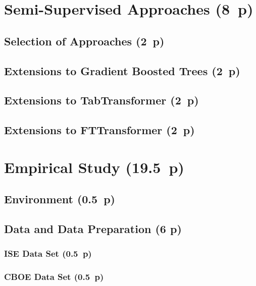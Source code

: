 \newpage
\section{Semi-Supervised Approaches (8~p)}\label{sec:semi-supervised-approaches}

\subsection{Selection of Approaches (2~p)}\label{sec:selection-of-approaches-1}

\subsection{Extensions to Gradient Boosted
  Trees (2~p)}\label{sec:extensions-to-gradient-boosted-trees}

\subsection{Extensions to TabTransformer (2~p)}\label{sec:extensions-to-tabtransformer}

\subsection{Extensions to FTTransformer (2~p)}\label{sec:extensions-to-fttransformer}


\newpage
\section{Empirical Study (19.5~p)}\label{sec:empirical-study}

\subsection{Environment (0.5~p)}\label{sec:environment}

\subsection{Data and Data Preparation (6 p)}\label{sec:data-and-data-preparation}

\subsubsection{ISE Data Set (0.5~p)}\label{sec:ise-data-set}

\subsubsection{CBOE Data Set (0.5~p)}\label{sec:cboe-data-set}

